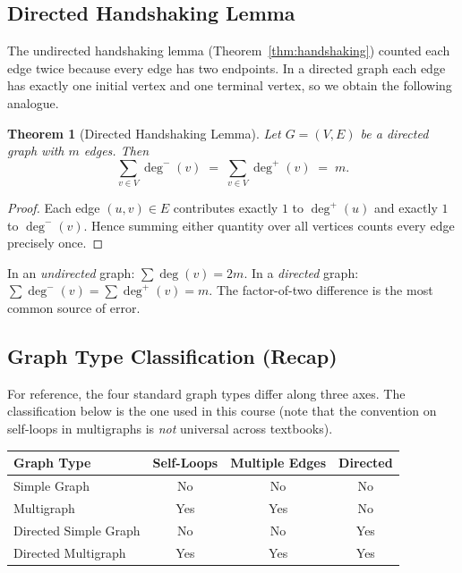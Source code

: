 \documentclass[11pt, a4paper, notitlepage]{report}
\newtheorem{theorem}{Theorem}[section]
\theoremstyle{definition}
\theoremstyle{remark}
\begin{document}
\subsection{Directed Handshaking Lemma}
\label{subsec:directed-handshaking}

The undirected handshaking lemma (Theorem~\ref{thm:handshaking}) counted each edge twice
because every edge has two endpoints. In a directed graph each edge has exactly one initial
vertex and one terminal vertex, so we obtain the following analogue.

\begin{theorem}[Directed Handshaking Lemma]
\label{thm:directed-handshaking}
Let $G = (V,E)$ be a directed graph with $m$ edges. Then
\[
  \sum_{v \in V} \deg^{-}(v) \;=\; \sum_{v \in V} \deg^{+}(v) \;=\; m.
\]
\end{theorem}

\begin{proof}
Each edge $(u,v) \in E$ contributes exactly $1$ to $\deg^{+}(u)$ and exactly $1$ to
$\deg^{-}(v)$. Hence summing either quantity over all vertices counts every edge precisely once.
\end{proof}

\begin{examtip}[title={Exam Tip: Directed vs.\ Undirected Handshaking}]
In an \emph{undirected} graph: $\sum \deg(v) = 2m$.
In a \emph{directed} graph: $\sum \deg^{-}(v) = \sum \deg^{+}(v) = m$.
The factor-of-two difference is the most common source of error.
\end{examtip}

\subsection{Graph Type Classification (Recap)}
\label{subsec:graph-types-recap}

For reference, the four standard graph types differ along three axes.
The classification below is the one used in this course (note that the convention on
self-loops in multigraphs is \emph{not} universal across textbooks).

\begin{center}
\begin{tabular}{lccc}
\toprule
\textbf{Graph Type} & \textbf{Self-Loops} & \textbf{Multiple Edges} & \textbf{Directed} \\
\midrule
Simple Graph           & No  & No  & No  \\
Multigraph             & Yes & Yes & No  \\
Directed Simple Graph  & No  & No  & Yes \\
Directed Multigraph    & Yes & Yes & Yes \\
\bottomrule
\end{tabular}
\end{center}
\end{document}
